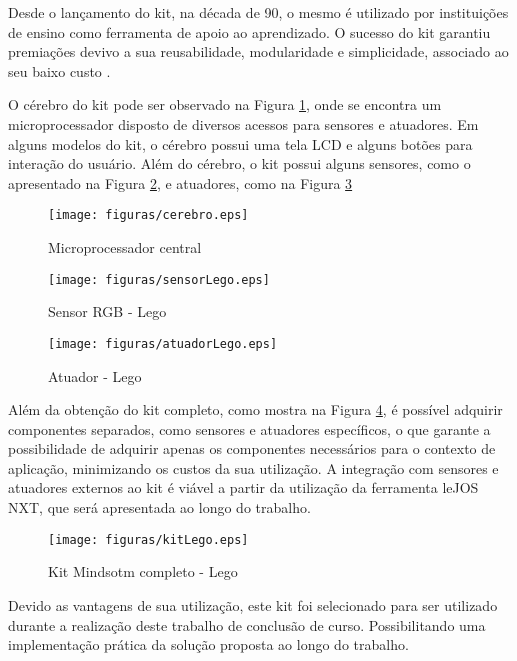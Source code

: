 Desde o lançamento do kit, na década de 90, o mesmo é utilizado por instituições de ensino como ferramenta de apoio ao aprendizado. O sucesso do kit garantiu premiações devivo a sua reusabilidade, modularidade e simplicidade, associado ao seu baixo custo \cite{teachingWithRoboticKit}.

O cérebro do kit pode ser observado na Figura \ref{img:cerebro}, onde se encontra um microprocessador disposto de diversos acessos para sensores e atuadores. Em alguns modelos do kit, o cérebro possui uma tela LCD e alguns botões para interação do usuário. Além do cérebro, o kit possui alguns sensores, como o apresentado na Figura \ref{img:sensorLego}, e atuadores, como na Figura \ref{img:atuadorLego}

\begin{figure}[H]
	\centering
	\texttt{[image: figuras/cerebro.eps]}
	\label{img:cerebro}
	\caption[Microprocessador central]{Microprocessador central}
\end{figure}	

\begin{figure}[H]
	\centering
	\texttt{[image: figuras/sensorLego.eps]}
	\caption[Sensor RGB - Lego]{Sensor RGB - Lego}
	\label{img:sensorLego}
\end{figure}	

\begin{figure}[H]
	\centering
	\texttt{[image: figuras/atuadorLego.eps]}
	\caption[Atuador - Lego]{Atuador - Lego}
	\label{img:atuadorLego}
\end{figure}

Além da obtenção do kit completo, como mostra na Figura \ref{img:kit}, é possível adquirir componentes separados, como sensores e atuadores específicos, o que garante a possibilidade de adquirir apenas os componentes necessários para o contexto de aplicação, minimizando os custos da sua utilização. A integração com sensores e atuadores externos ao kit é viável a partir da utilização da ferramenta leJOS NXT, que será apresentada ao longo do trabalho.

\begin{figure}[H]
	\centering
	\texttt{[image: figuras/kitLego.eps]}
	\caption[Kit Mindsotm completo - Lego]{Kit Mindsotm completo - Lego}
	\label{img:kit}
\end{figure}

Devido as vantagens de sua utilização, este kit foi selecionado para ser utilizado durante a realização deste trabalho de conclusão de curso. Possibilitando uma implementação prática da solução proposta ao longo do trabalho.


